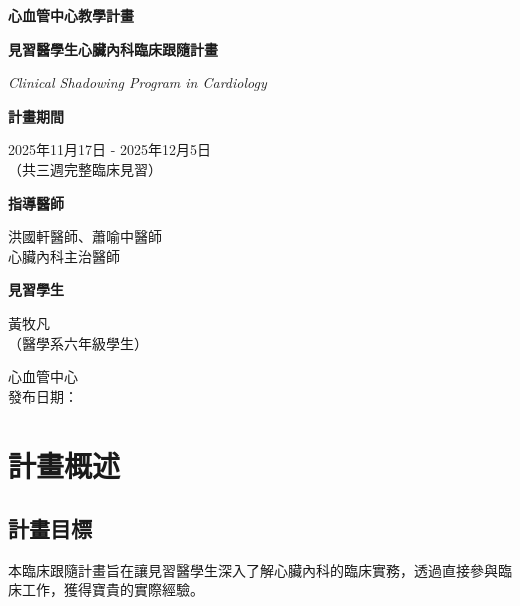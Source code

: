 \documentclass[12pt,a4paper]{article}
\newcommand{\mydate}{\DTMtoday}
\begin{document}
\begin{titlepage}
    \centering
    {\LARGE\textcolor{emergency_red}{\textbf{心血管中心教學計畫}}\par}
    \vspace{1cm}
    {\huge\bfseries 見習醫學生心臟內科臨床跟隨計畫\par}
    \vspace{0.5cm}
    {\Large\textcolor{emergency_blue}{\textit{Clinical Shadowing Program in Cardiology}}\par}
    \vspace{1cm}
    
    \begin{tcolorbox}[
        colback=emergency_blue!5!white,
        colframe=emergency_blue,
        width=0.8\textwidth,
        arc=10pt,
        boxrule=1pt
    ]
    \centering
    {\large\textbf{計畫期間}\par}
    \vspace{0.3cm}
    2025年11月17日 - 2025年12月5日\\
    （共三週完整臨床見習）\\
    \vspace{0.5cm}
    {\large\textbf{指導醫師}\par}
    \vspace{0.3cm}
    洪國軒醫師、蕭喻中醫師\\
    心臟內科主治醫師\\
    \vspace{0.5cm}
    {\large\textbf{見習學生}\par}
    \vspace{0.3cm}
    黃牧凡\\
    （醫學系六年級學生）
    \end{tcolorbox}

    \vfill
    
    {\large 心血管中心\\ 發布日期：\mydate}
    
    \vspace{0.5cm}
\end{titlepage}

\newpage
\tableofcontents
\newpage

\section{計畫概述}

\subsection{計畫目標}
本臨床跟隨計畫旨在讓見習醫學生深入了解心臟內科的臨床實務，透過直接參與臨床工作，獲得寶貴的實際經驗。
\end{document}
